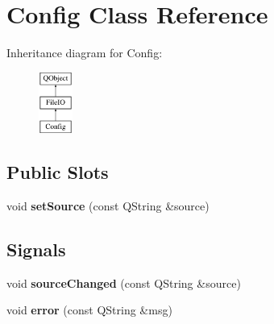 \hypertarget{class_config}{}\section{Config Class Reference}
\label{class_config}
Inheritance diagram for Config\+:\begin{figure}[H]
\begin{center}
\leavevmode
\includegraphics[height=2.000000cm]{class_config}
\end{center}
\end{figure}
\subsection*{Public Slots}
\begin{DoxyCompactItemize}
\item 
\hypertarget{class_config_a530e025b1029f52cfb30db55ad388a5b}{}void {\bfseries set\+Source} (const Q\+String \&source)\label{class_config_a530e025b1029f52cfb30db55ad388a5b}

\end{DoxyCompactItemize}
\subsection*{Signals}
\begin{DoxyCompactItemize}
\item 
\hypertarget{class_config_a050a986da8a1e6bb56abfdf1b52dea44}{}void {\bfseries source\+Changed} (const Q\+String \&source)\label{class_config_a050a986da8a1e6bb56abfdf1b52dea44}

\item 
\hypertarget{class_config_a1424b845bdd6decb86f87d1673912bfc}{}void {\bfseries error} (const Q\+String \&msg)\label{class_config_a1424b845bdd6decb86f87d1673912bfc}

\end{DoxyCompactItemize}
